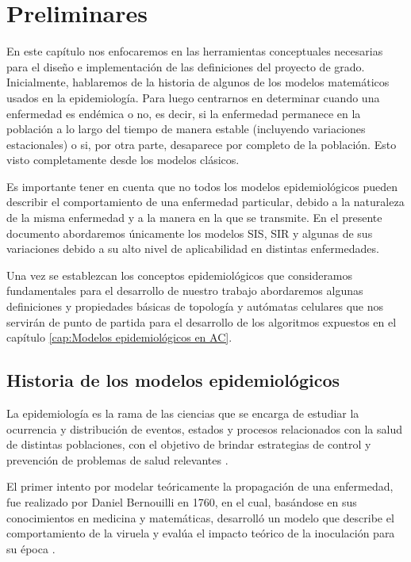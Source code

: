 \chapter{Preliminares}\label{cap:Preliminares}

En este capítulo nos enfocaremos en las herramientas conceptuales necesarias para el diseño e implementación de las definiciones del proyecto de grado. Inicialmente, hablaremos de la historia de algunos de los modelos matemáticos usados en la epidemiología. Para luego centrarnos en determinar cuando una enfermedad es endémica o no, es decir, si la enfermedad permanece en la población a lo largo del tiempo de manera estable (incluyendo variaciones estacionales) o si, por otra parte, desaparece por completo de la población. Esto visto completamente desde los modelos clásicos.

Es importante tener en cuenta que no todos los modelos epidemiológicos pueden describir el comportamiento de una enfermedad particular, debido a la naturaleza de la misma enfermedad y a la manera en la que se transmite. En el presente documento abordaremos únicamente los modelos SIS, SIR y algunas de sus variaciones debido a su alto nivel de aplicabilidad en distintas enfermedades.

Una vez se establezcan los conceptos epidemiológicos que consideramos fundamentales para el desarrollo de nuestro trabajo abordaremos algunas definiciones y propiedades básicas de topología y autómatas celulares que nos servirán de punto de partida para el desarrollo de los algoritmos expuestos en el capítulo \ref{cap:Modelos epidemiológicos en AC}.

\section{Historia de los modelos epidemiológicos}\label{sec:HistoriaEpidemiología}
La epidemiología es la rama de las ciencias que se encarga de estudiar la ocurrencia y distribución de eventos, estados y procesos relacionados con la salud de distintas poblaciones, con el objetivo de brindar estrategias de control y prevención de problemas de salud relevantes \cite{epiDictionary}.

El primer intento por modelar teóricamente la propagación de una enfermedad, fue realizado por Daniel Bernouilli en 1760, en el cual, basándose en sus conocimientos en medicina y matemáticas, desarrolló un modelo que describe el comportamiento de la viruela y evalúa el impacto teórico de la inoculación para su época \cite{shortHistory}. 

